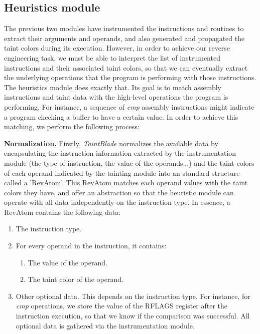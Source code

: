 \documentclass[conference]{IEEEtran}
\begin{document}

\subsection{Heuristics module}
The previous two modules have instrumented the instructions and routines to
extract their arguments and operands, and also generated and propagated the
taint colors during its execution. However, in order to achieve our reverse
engineering task, we must be able to interpret the list of instrumented
instructions and their associated taint colors, so that we can eventually
extract the underlying operations that the program is performing with those
instructions. The heuristics module does exactly that. Its goal is to match
assembly instructions and taint data with the high-level operations the program
is performing. For instance, a sequence of \textit{cmp} assembly instructions
might indicate a program checking a buffer to have a certain value. In order to
achieve this matching, we perform the following process:

\textbf{Normalization.}
Firstly, \textit{TaintBlade} normalizes the available data by encapsulating the instruction information
extracted by the instrumentation module (the type of instruction, the value of the operands...) and the
taint colors of each operand indicated by the tainting module into an standard structure called a 'RevAtom'.
This RevAtom matches each operand values with the taint colors they have, and offer an abstraction
so that the heuristic module can operate with all data independently on the instruction type. In essence,
a RevAtom contains the following data:

\begin{enumerate}
    \item The instruction type.
    \item For every operand in the instruction, it contains:
          \begin{enumerate}
              \item The value of the operand.
              \item The taint color of the operand.
          \end{enumerate}
    \item Other optional data. This depends on the instruction type. For instance, for
          \textit{cmp} operations, we store the value of the RFLAGS register after the
          instruction execution, so that we know if the comparison was successful. All
          optional data is gathered via the instrumentation module.
\end{enumerate}
\end{document}
